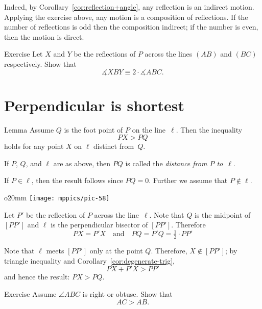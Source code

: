 Indeed, by Corollary~\ref{cor:reflection+angle}, any reflection is an indirect motion.
Applying the exercise above, any motion is a composition of reflections.
If the number of reflections is odd then the composition indirect;
if the number is even, then the motion is direct.

\begin{thm}{Exercise}\label{ex:2-reflections}
Let $X$ and $Y$ be the reflections of $P$ across the lines $(AB)$ and $(BC)$ respectively.
Show that 
$$\measuredangle XBY\equiv 2\cdot \measuredangle ABC.$$

\end{thm}

\section*{Perpendicular is shortest}

\begin{thm}[\abs]{Lemma}\label{lem:perp<oblique}
Assume $Q$ is the foot point of $P$ on the line~$\ell$.
Then the inequality
$$PX>PQ$$
holds for any point $X$ on $\ell$ distinct from~$Q$. 
\end{thm}

If $P$, $Q$, and $\ell$ are as above, 
then $PQ$ is called the \label{distance!from a point to a line}\emph{distance from $P$ to~$\ell$}. 

If $P\in \ell$, 
then the result follows since $PQ=0$.
Further we assume that $P\notin \ell$.

\begin{wrapfigure}{o}{20mm}
\centering
\texttt{[image: mppics/pic-58]}
\end{wrapfigure}

Let $P'$ be the reflection of $P$ across the line~$\ell$.
Note that $Q$ is the midpoint of $[PP']$
and $\ell$ is the perpendicular bisector of $[PP']$.
Therefore
$$PX=P'X
\quad
\text{and}
\quad
PQ=P'Q=\tfrac12\cdot PP'$$

Note that $\ell$ meets $[PP']$ only at the point $Q$.
Therefore, $X\notin [PP']$; by triangle inequality and Corollary~\ref{cor:degenerate-trig},
$$PX+P'X>PP'$$
and hence the result: $PX>PQ$.
\qeds

\begin{thm}{Exercise}\label{ex:obtuce}
Assume $\angle ABC$ is right or obtuse.
Show that 
\[AC>AB.\]

\end{thm}

